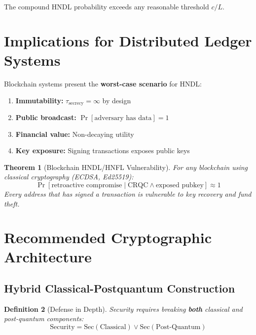 \documentclass[11pt,a4paper]{article}
\newtheorem{theorem}{Theorem}[section]
\newtheorem{definition}[theorem]{Definition}
\begin{document}
The compound HNDL probability exceeds any reasonable threshold $c/L$.

\section{Implications for Distributed Ledger Systems}

Blockchain systems present the \textbf{worst-case scenario} for HNDL:

\begin{enumerate}[noitemsep]
    \item \textbf{Immutability:} $\tau_{\text{secrecy}} = \infty$ by design
    \item \textbf{Public broadcast:} $\Pr[\text{adversary has data}] = 1$
    \item \textbf{Financial value:} Non-decaying utility
    \item \textbf{Key exposure:} Signing transactions exposes public keys
\end{enumerate}

\begin{theorem}[Blockchain HNDL/HNFL Vulnerability]
For any blockchain using classical cryptography (ECDSA, Ed25519):
\begin{equation}
\Pr[\text{retroactive compromise} \mid \text{CRQC} \land \text{exposed pubkey}] \approx 1
\end{equation}
Every address that has signed a transaction is vulnerable to key recovery and fund theft.
\end{theorem}

\section{Recommended Cryptographic Architecture}

\subsection{Hybrid Classical-Postquantum Construction}

\begin{definition}[Defense in Depth]
Security requires breaking \textbf{both} classical and post-quantum components:
\begin{equation}
\text{Security} = \text{Sec}(\text{Classical}) \lor \text{Sec}(\text{Post-Quantum})
\end{equation}
\end{definition}
\end{document}
